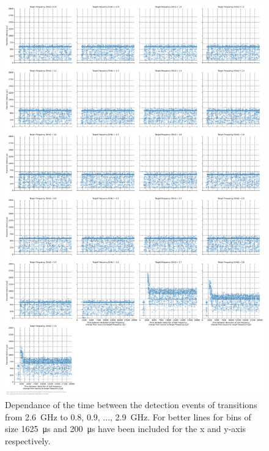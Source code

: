 \begin{figure}[]
    \centering
    \includegraphics[width=\columnwidth]{fig/ftalat/ftalat_scatter_wait_transition_latency_hati_source_2.6.pdf}
    \caption{Dependance of the time between the detection events of transitions from \SI{2.6}{\GHz} to \SI{0.8}{}, \SI{0.9}{}, ..., \SI{2.9}{\GHz}. For better lines for bins of size \SI{1625}{\us} and \SI{200}{\us} have been included for the x and y-axis respectively.}
\end{figure}
